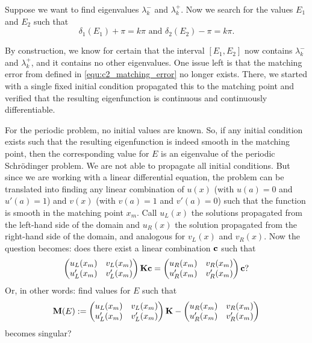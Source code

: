Suppose we want to find eigenvalues $\lambda_k^{-}$ and $\lambda_k^{+}$. Now we search for the values $E_1$ and $E_2$ such that
$$
    \delta_1(E_1) + \pi = k \pi \text{ and } \delta_2(E_2) - \pi = k \pi\text{.}
$$

By construction, we know for certain that the interval $[E_1, E_2]$ now contains $\lambda_k^{-}$ and $\lambda_k^{+}$, and it contains no other eigenvalues. One issue left is that the matching error from defined in \eqref{equ:c2_matching_error} no longer exists. There, we started with a single fixed initial condition propagated this to the matching point and verified that the resulting eigenfunction is continuous and continuously differentiable.

For the periodic problem, no initial values are known. So, if any initial condition exists such that the resulting eigenfunction is indeed smooth in the matching point, then the corresponding value for $E$ is an eigenvalue of the periodic Schrödinger problem. We are not able to propagate all initial conditions. But since we are working with a linear differential equation, the problem can be translated into finding any linear combination of $u(x)$ (with $u(a) = 0$ and $u'(a)=1$) and $v(x)$ (with $v(a) = 1$ and $v'(a)=0$) such that the function is smooth in the matching point $x_m$. Call $u_L(x)$ the solutions propagated from the left-hand side of the domain and $u_R(x)$ the solution propagated from the right-hand side of the domain, and analogous for $v_L(x)$ and $v_R(x)$. Now the question becomes: does there exist a linear combination $\vb{c}$ such that
$$
    \begin{pmatrix}
        u_L(x_m)  & v_L(x_m)  \\
        u'_L(x_m) & v'_L(x_m)
    \end{pmatrix} \vb{K} \vb{c} = \begin{pmatrix}
        u_R(x_m)  & v_R(x_m)  \\
        u'_R(x_m) & v'_R(x_m)
    \end{pmatrix}\vb{c}
    \text{?}
$$
Or, in other words: find values for $E$ such that
\begin{equation}\label{equ:c2_periodic_match_matrix}
    \vb{M}(E) := \begin{pmatrix}
        u_L(x_m)  & v_L(x_m)  \\
        u'_L(x_m) & v'_L(x_m)
    \end{pmatrix} \vb{K} - \begin{pmatrix}
        u_R(x_m)  & v_R(x_m)  \\
        u'_R(x_m) & v'_R(x_m)
    \end{pmatrix}
\end{equation}
becomes singular?

